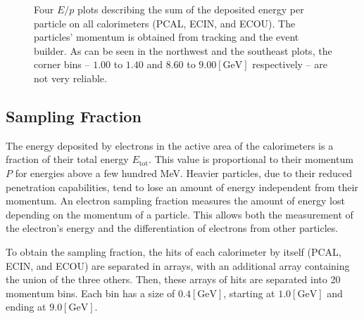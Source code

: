     \begin{figure}[b!]
        \centering{}
        \caption[Calorimeters $E/p$ plots]{Four $E/p$ plots describing the sum of the deposited energy per particle on all calorimeters (PCAL, ECIN, and ECOU). The particles' momentum is obtained from tracking and the event builder. As can be seen in the northwest and the southeast plots, the corner bins -- $1.00$ to $1.40$ and $8.60$ to $9.00 [\text{GeV}]$ respectively -- are not very reliable.}
        \label{fig::sf_1d}
    \end{figure}
    
\subsection{Sampling Fraction} \label{ssec::sampling_fraction}
    The energy deposited by electrons in the active area of the calorimeters is a fraction of their total energy $E_\text{tot}$.
    This value is proportional to their momentum $P$ for energies above a few hundred MeV.
    Heavier particles, due to their reduced penetration capabilities, tend to lose an amount of energy independent from their momentum.
    An electron sampling fraction measures the amount of energy lost depending on the momentum of a particle.
    This allows both the measurement of the electron's energy and the differentiation of electrons from other particles. %

    To obtain the sampling fraction, the hits of each calorimeter by itself (PCAL, ECIN, and ECOU) are separated in arrays, with an additional array containing the union of the three others.
    Then, these arrays of hits are separated into 20 momentum bins.
    Each bin has a size of $0.4 [\text{GeV}]$, starting at $1.0 [\text{GeV}]$ and ending at $9.0 [\text{GeV}]$.

